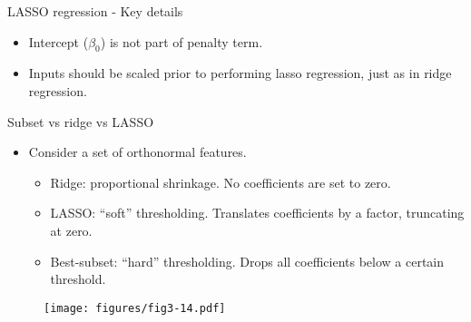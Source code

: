 \documentclass[aspectratio=169]{beamer}
\begin{document}
\begin{frame}{LASSO regression - Key details}
    \begin{itemize}
        \item Intercept ($\beta_0$) is not part of penalty term.
        \item Inputs should be scaled prior to performing lasso regression, just as in ridge regression.
    \end{itemize}
\end{frame} 


\begin{frame}{Subset vs ridge vs LASSO}
    \begin{itemize}
        \item Consider a set of orthonormal features.
        \begin{itemize}
            \item Ridge: proportional shrinkage. No coefficients are set to zero.
            \item LASSO: ``soft'' thresholding. Translates coefficients by a factor, truncating at zero.
            \item Best-subset: ``hard'' thresholding. Drops all coefficients below a certain threshold.
        \end{itemize}
    \end{itemize}
    \begin{figure}
        \texttt{[image: figures/fig3-14.pdf]}
    \end{figure}
\end{frame} 
\end{document}
